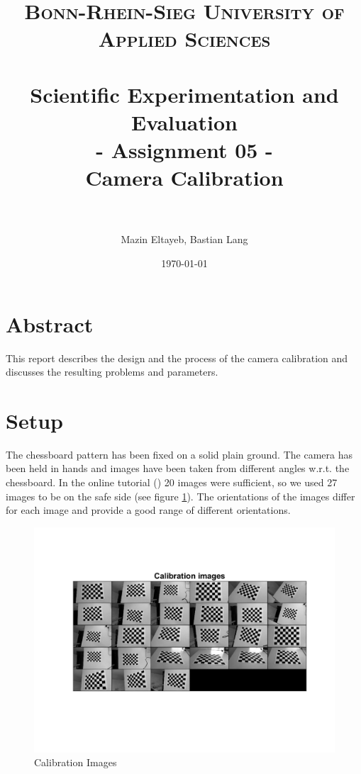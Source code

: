 \documentclass[paper=a4, fontsize=11pt]{scrartcl} %
\title{	
\normalfont \normalsize 
\textsc{Bonn-Rhein-Sieg University of Applied Sciences} \\ [25pt] %
\horrule{0.5pt} \\[0.4cm] %
\huge Scientific Experimentation and Evaluation\\
- Assignment 05 - \\ 
Camera Calibration\\%
\horrule{2pt} \\[0.5cm] %
}
\author{Mazin Eltayeb, Bastian Lang} %
\date{\normalsize\today} %
\numberwithin{equation}{section} %
\numberwithin{figure}{section} %
\numberwithin{table}{section} %
\begin{document}
\maketitle %

\tableofcontents
\newpage

\section{Abstract}
This report describes the design and the process of the camera calibration and discusses the resulting problems and parameters.

\section{Setup}
The chessboard pattern has been fixed on a solid plain ground.
The camera has been held in hands and images have been taken from different angles w.r.t. the chessboard.
In the online tutorial (\cite{tutorial}) 20 images were sufficient, so we used 27 images to be on the safe side (see figure \ref{ref_images}).
The orientations of the images differ for each image and provide a good range of different orientations.

\begin{figure}[H]
	\centering
	\includegraphics[width = 0.8\linewidth]{images.jpg}
	\caption{Calibration Images}
	\label{ref_images}
\end{figure}
\end{document}
